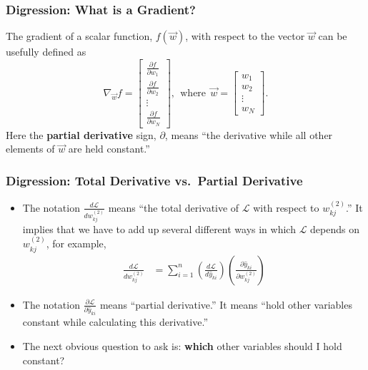 \documentclass{beamer}
\begin{document}
\begin{frame}
  \frametitle{Digression: What is a Gradient?}

  The gradient of a scalar function, $f(\vec{w})$, with respect to
  the vector $\vec{w}$ can be usefully defined as
  \begin{displaymath}
    \nabla_{\vec{w}} f=\left[\begin{array}{c}
        \frac{\partial f}{\partial w_{1}}\\
        \frac{\partial f}{\partial w_{2}}\\
        \vdots\\
        \frac{\partial f}{\partial w_{N}}
      \end{array}\right],~~\mbox{where}~~
    \vec{w}=\left[\begin{array}{cccc}
        w_{1}\\
        w_{2}\\
        \vdots\\
        w_{N}
      \end{array}\right].
  \end{displaymath}
  Here the {\bf partial derivative} sign, $\partial$, means ``the
  derivative while all other elements of $\vec{w}$ are held
  constant.''
\end{frame}

\begin{frame}
  \frametitle{Digression: Total Derivative vs.~Partial Derivative}
  
  \begin{itemize}
  \item The notation $\frac{d{\mathcal L}}{dw_{kj}^{(2)}}$ means
    ``the total derivative of ${\mathcal L}$ with respect to
    $w_{kj}^{(2)}$.'' It implies that we have to add up several
    different ways in which ${\mathcal L}$ depends on
    $w_{kj}^{(2)}$, for example,
    \begin{align*}
      \frac{d{\mathcal L}}{dw_{kj}^{(2)}} &=
      \sum_{i=1}^n
      \left(\frac{d{\mathcal L}}{d\hat{y}_{ki}}\right)
      \left(\frac{\partial\hat{y}_{ki}}{\partial w_{kj}^{(2)}}\right)
    \end{align*}
  \item The notation $\frac{\partial{\mathcal
      L}}{\partial\hat{y}_{ki}}$ means ``partial derivative.''  It
    means ``hold other variables constant while calculating this
    derivative.''
  \item The next obvious question to ask is: {\bf which} other variables
    should I hold constant?
  \end{itemize}
\end{frame}
\end{document}
